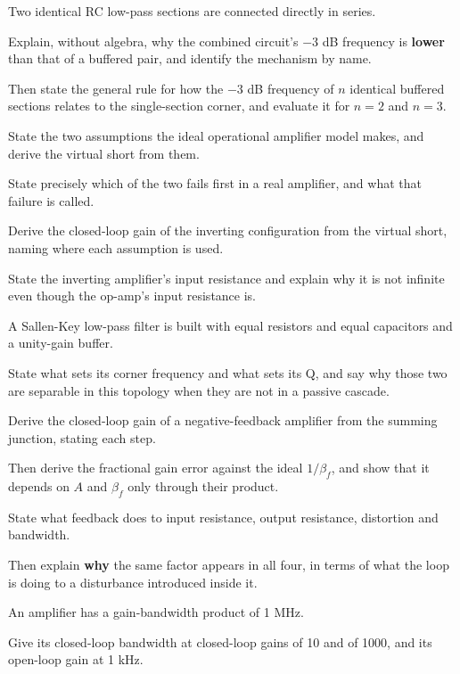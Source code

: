  Two identical RC low-pass sections are connected directly in series.

Explain, without algebra, why the combined circuit's $-3$ dB frequency is \textbf{lower} than that of a buffered pair, and identify the mechanism by name.

Then state the general rule for how the $-3$ dB frequency of $n$ identical buffered sections relates to the single-section corner, and evaluate it for $n = 2$ and $n = 3$.

 State the two assumptions the ideal operational amplifier model makes, and derive the virtual short from them.

State precisely which of the two fails first in a real amplifier, and what that failure is called.

 Derive the closed-loop gain of the inverting configuration from the virtual short, naming where each assumption is used.

State the inverting amplifier's input resistance and explain why it is not infinite even though the op-amp's input resistance is.

 A Sallen-Key low-pass filter is built with equal resistors and equal capacitors and a unity-gain buffer.

State what sets its corner frequency and what sets its Q, and say why those two are separable in this topology when they are not in a passive cascade.

\label{exb:q:4}

 Derive the closed-loop gain of a negative-feedback amplifier from the summing junction, stating each step.

Then derive the fractional gain error against the ideal $1/\beta_f$, and show that it depends on $A$ and $\beta_f$ only through their product.

 State what feedback does to input resistance, output resistance, distortion and bandwidth.

Then explain \textbf{why} the same factor appears in all four, in terms of what the loop is doing to a disturbance introduced inside it.

 An amplifier has a gain-bandwidth product of 1 MHz.

Give its closed-loop bandwidth at closed-loop gains of 10 and of 1000, and its open-loop gain at 1 kHz.

